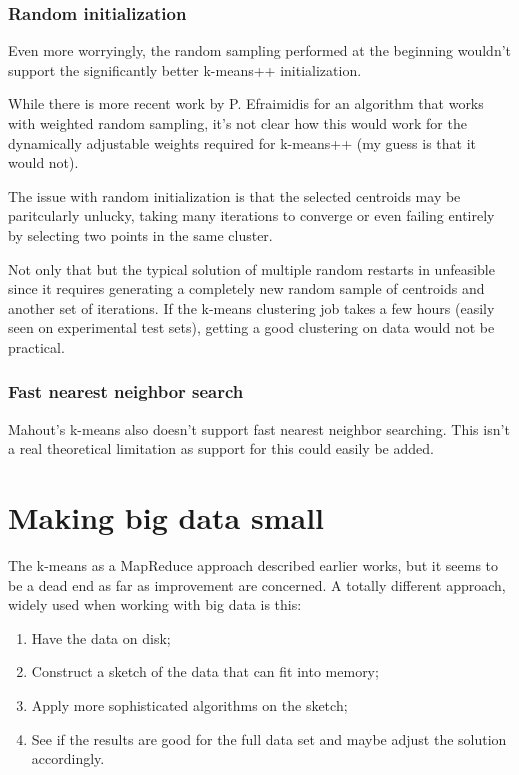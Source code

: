 \documentclass{article}
\begin{document}
\subsubsection{Random initialization}
Even more worryingly, the random sampling performed at the beginning wouldn't
support the significantly better k-means++ initialization.

While there is more recent work by P. Efraimidis \cite{efraimidis} for
an algorithm that works with weighted random sampling, it's not clear how this
would work for the dynamically adjustable weights required for k-means++ (my
guess is that it would not).

The issue with random initialization is that the selected centroids may be
paritcularly unlucky, taking many iterations to converge or even failing
entirely by selecting two points in the same cluster.

Not only that but the typical solution of multiple random restarts in
unfeasible since it requires generating a completely new random sample of
centroids and another set of iterations. If the k-means clustering job takes a
few hours (easily seen on experimental test sets), getting a good clustering on
data would not be practical.

\subsubsection{Fast nearest neighbor search}
Mahout's k-means also doesn't support fast nearest neighbor searching. This
isn't a real theoretical limitation as support for this could easily be added.

\section{Making big data small}

The k-means as a MapReduce approach described earlier works, but it seems to be
a dead end as far as improvement are concerned.
A totally different approach, widely used when working with big data is
this:
\begin{enumerate}
    \item Have the data on disk;
    \item Construct a sketch of the data that can fit into memory;
    \item Apply more sophisticated algorithms on the sketch;
    \item See if the results are good for the full data set and maybe adjust
        the solution accordingly.
\end{enumerate}
\end{document}
